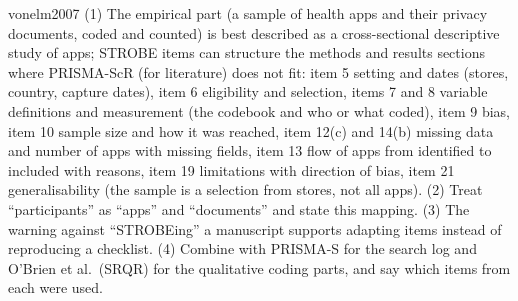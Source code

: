 \begin{papercard}{vonelm2007}
 (1) The empirical part (a sample of health apps and their privacy documents, coded and counted) is best described as a cross-sectional descriptive study of apps; STROBE items can structure the methods and results sections where PRISMA-ScR (for literature) does not fit: item 5 setting and dates (stores, country, capture dates), item 6 eligibility and selection, items 7 and 8 variable definitions and measurement (the codebook and who or what coded), item 9 bias, item 10 sample size and how it was reached, item 12(c) and 14(b) missing data and number of apps with missing fields, item 13 flow of apps from identified to included with reasons, item 19 limitations with direction of bias, item 21 generalisability (the sample is a selection from stores, not all apps). (2) Treat ``participants'' as ``apps'' and ``documents'' and state this mapping. (3) The warning against ``STROBEing'' a manuscript supports adapting items instead of reproducing a checklist. (4) Combine with PRISMA-S for the search log and O'Brien et al.\ (SRQR) for the qualitative coding parts, and say which items from each were used.
\end{papercard}
